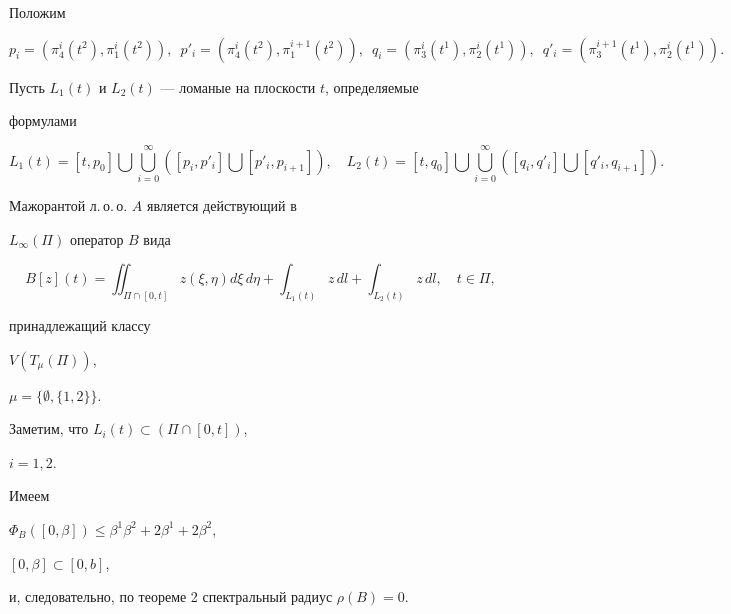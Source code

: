 Положим


$$


p_i=({\pi}^i_4(t^2),{\pi}^i_1(t^2)),\ \;


p'_i=({\pi}^i_4(t^2),{\pi}^{i+1}_1(t^2)),\ \;


q_i=({\pi}^i_3(t^1),{\pi}^i_2(t^1)),\ \;


q'_i=({\pi}^{i+1}_3(t^1),{\pi}^i_2(t^1)).


$$


Пусть $L_1(t)$ и $L_2(t)$ --- ломаные на плоскости $t$, определяемые


формулами


$$


L_1(t)=[t,p_0]\bigcup \bigcup^{\infty}_{i=0}(


[p_i,p'_i]\bigcup [p'_i,p_{i+1}]),\quad


L_2(t)=[t,q_0]\bigcup \bigcup^{\infty}_{i=0}(


[q_i,q'_i]\bigcup [q'_i,q_{i+1}]).


$$





Мажорантой л.\,о.\,о. $A$ является действующий в


$L_{\infty}(\Pi)$ оператор $B$ вида


$$


B[z](t) = \iint_{\Pi \cap [0,t]} z(\xi, \eta) d\xi\, d\eta +


\int_{L_1(t)}z\, dl + \int_{L_2(t)} z\, dl,


\quad t\in\Pi,


$$


принадлежащий классу


$V(T_\mu(\Pi))$,


$\mu=\{\emptyset,\{1,2\}\}$.


Заметим, что $L_i(t) \subset ( \Pi \cap [0,t])$,


$i=1,2$.


Имеем


${\Phi}_B([0,\beta])\le


\beta^1\beta^2+2\beta^1+2\beta^2$,


$[0,\beta]\subset[0,b]$,


и, следовательно, по теореме 2 спектральный радиус $\rho(B)=0$.





